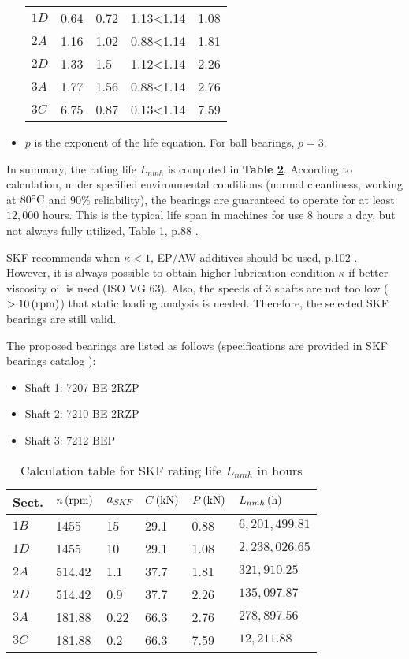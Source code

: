 \begin{itemize}
\begin{table}[ht]
\begin{tabular}{lllll}
			$ 1D $ & 0.64 & 0.72 & 1.13<1.14 & 1.08 \\
			$ 2A $ & 1.16 & 1.02 & 0.88<1.14 & 1.81 \\
			$ 2D $ & 1.33 & 1.5  & 1.12<1.14 & 2.26 \\
			$ 3A $ & 1.77 & 1.56 & 0.88<1.14 & 2.76 \\
			$ 3C $ & 6.75 & 0.87 & 0.13<1.14 & 7.59 \\
			\bottomrule
		\end{tabular}
		\label{Pload}
	\end{table}
	\item $ p $ is the exponent of the life equation. For ball bearings, $ p = 3 $.
\end{itemize}

In summary, the rating life $ L_{nmh} $ is computed in \textbf{Table \ref{ratinglife}}. According to calculation, under specified environmental conditions (normal cleanliness, working at $ 80^\circ \text{C} $ and $ 90\% $ reliability), the bearings are guaranteed to operate for at least $ 12,000 $ hours. This is the typical life span in machines for use 8 hours a day, but not always fully utilized, Table 1, p.88 \cite{rolling_bearings}.

SKF recommends when $ \kappa < 1 $, EP/AW additives should be used, p.102 \cite{rolling_bearings}. However, it is always possible to obtain higher lubrication condition $ \kappa $ if better viscosity oil is used (ISO VG 63). Also, the speeds of 3 shafts are not too low ($ > 10 \, (\mathrm{rpm}) $) that static loading analysis is needed. Therefore, the selected SKF bearings are still valid.

The proposed bearings are listed as follows (specifications are provided in SKF bearings catalog \cite{rolling_bearings}):
\begin{itemize}
	\item Shaft 1: 7207 BE-2RZP
	\item Shaft 2: 7210 BE-2RZP
	\item Shaft 3: 7212 BEP
\end{itemize}
\begin{table}[ht]
	\centering
	\caption{Calculation table for SKF rating life $ L_{nmh} $ in hours}
	\begin{tabular}{llllll}\toprule
		Sect. & $ n \, (\mathrm{rpm}) $ & $ a_{SKF} $ & $ C \, (\mathrm{kN}) $ & $ P \, (\mathrm{kN}) $ & $ L_{nmh} \, (\mathrm{h}) $ \\ \midrule
		$ 1B $ & 1455   & 15   & 29.1 & 0.88 & $ 6,201,499.81 $ \\
		$ 1D $ & 1455   & 10   & 29.1 & 1.08 & $ 2,238,026.65 $ \\
		$ 2A $ & 514.42 & 1.1  & 	37.7 & 1.81 & $ 321,910.25 $ \\
		$ 2D $ & 514.42 & 0.9  & 37.7 & 2.26 & $ 135,097.87 $ \\
		$ 3A $ & 181.88 & 0.22 & 66.3 & 2.76 & $ 278,897.56 $ \\
		$ 3C $ & 181.88 & 0.2  & 66.3 & 7.59 & $ 12,211.88 $ \\
		\bottomrule
	\end{tabular}
	\label{ratinglife}
\end{table}